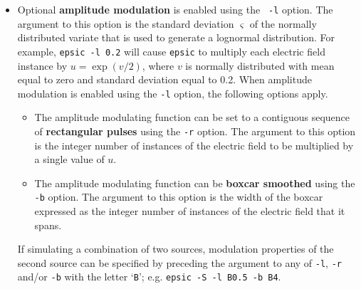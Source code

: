 \documentclass[fullpage]{article}
\begin{document}
\begin{itemize}
\item Optional {\bf amplitude modulation} is enabled using the {\tt
  -l} option.  The argument to this option is the standard deviation
  $\varsigma$ of the normally distributed variate that is used to
  generate a lognormal distribution.  For example, {\tt epsic -l
    0.2} will cause {\tt epsic} to multiply each electric field
  instance by $u=\exp(v/2)$, where $v$ is normally distributed with
  mean equal to zero and standard deviation equal to 0.2.  When
  amplitude modulation is enabled using the {\tt -l} option, the
  following options apply.
  
  \begin{itemize}
  \item
    The amplitude modulating function can be set to a contiguous
    sequence of {\bf rectangular pulses} using the {\tt -r} option.  The
    argument to this option is the integer number of instances of the
    electric field to be multiplied by a single value of $u$. 
  \item
    The amplitude modulating function can be {\bf boxcar smoothed} using the
    {\tt -b} option.  The argument to this option is the width of the
    boxcar expressed as the integer number of instances of the
    electric field that it spans.
  \end{itemize}

  If simulating a combination of two sources, modulation properties of
  the second source can be specified by preceding the argument to any
  of {\tt -l}, {\tt -r} and/or {\tt -b} with the letter `{\tt B}';
  e.g. {\tt epsic -S -l B0.5 -b B4}.
  
\end{itemize}
%
\end{document}
